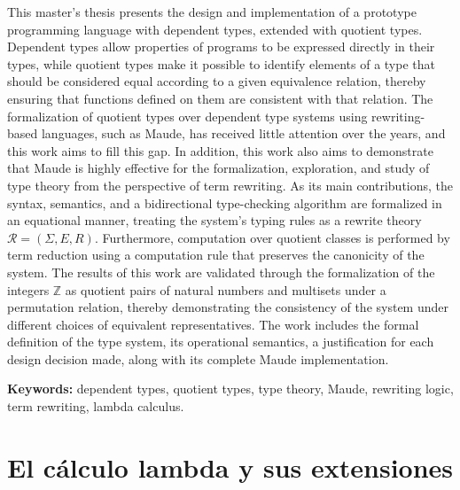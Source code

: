 This master’s thesis presents the design and implementation of a prototype programming language with dependent types, extended with quotient types. Dependent types allow properties of programs to be expressed directly in their types, while quotient types make it possible to identify elements of a type that should be considered equal according to a given equivalence relation, thereby ensuring that functions defined on them are consistent with that relation. The formalization of quotient types over dependent type systems using rewriting-based languages, such as Maude, has received little attention over the years, and this work aims to fill this gap. In addition, this work also aims to demonstrate that Maude is highly effective for the formalization, exploration, and study of type theory from the perspective of term rewriting. As its main contributions, the syntax, semantics, and a bidirectional type-checking algorithm are formalized in an equational manner, treating the system’s typing rules as a rewrite theory $\mathcal{R} = (\Sigma, E, R)$. Furthermore, computation over quotient classes is performed by term reduction using a computation rule that preserves the canonicity of the system. The results of this work are validated through the formalization of the integers $\mathbb{Z}$ as quotient pairs of natural numbers and multisets under a permutation relation, thereby demonstrating the consistency of the system under different choices of equivalent representatives. The work includes the formal definition of the type system, its operational semantics, a justification for each design decision made, along with its complete Maude implementation.

\vspace{1em}
\noindent\textbf{Keywords:} dependent types, quotient types, type theory, Maude, rewriting logic, term rewriting, lambda calculus.

\tableofcontents


\cleardoublepage
{}
\chapter{El cálculo lambda y sus extensiones}\label{ch:prelim}
